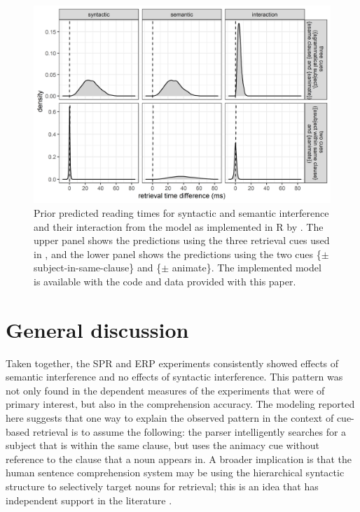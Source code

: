 \documentclass[a4paper, man, floatsintext]{apa7}
\begin{document}
\begin{figure}[H]
    \centering
    \caption{Prior predicted reading times for syntactic and semantic interference and their interaction from the \textcite{Lewis2005} model as implemented in R by \textcite{engelmann_etal_2019}. The upper panel shows the predictions using the three retrieval cues used in \textcite{mertzen}, and the lower panel shows the predictions using the two cues \{$\pm$ subject-in-same-clause\} and \{$\pm$ animate\}. 
    The implemented model is available with the code and data provided with this paper.}
    \label{fig:model_predictions}\includegraphics[width=\textwidth]{images/PriorPredicted_interACTversions_2vs3.png}
\end{figure}



\section{General discussion}

Taken together, the SPR and ERP experiments consistently showed effects of semantic interference and no effects of syntactic interference. This pattern was not only found in the dependent measures of the experiments that were of primary interest, but also in the comprehension accuracy. 
The modeling reported here suggests that one way to explain the observed pattern in the context of cue-based retrieval is to assume the following: the parser intelligently searches for a subject that is within the same clause, but uses the animacy cue without reference to the clause that a noun appears in. A broader implication is that the human sentence comprehension system may be using the hierarchical syntactic structure to selectively target nouns for retrieval; this is an idea that has independent support in the literature \citep[e.g.,][]{Sturt2003,dillon2013}.
\end{document}
